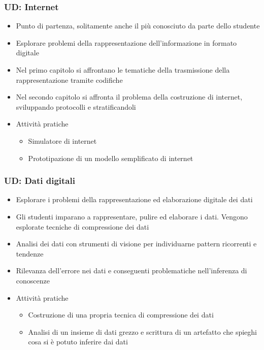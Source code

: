 \documentclass{beamer}
\begin{document}
\begin{frame}
  \frametitle{UD: Internet}

  \begin{itemize}
    \item Punto di partenza, solitamente anche il più conosciuto da parte dello studente
    \item Esplorare problemi della rappresentazione dell'informazione in formato digitale
    \item Nel primo capitolo si affrontano le tematiche della trasmissione della rappresentazione tramite codifiche
    \item Nel secondo capitolo si affronta il problema della costruzione di internet, sviluppando protocolli e stratificandoli
    \item Attività pratiche
    \begin{itemize}
      \item Simulatore di internet
      \item Prototipazione di un modello semplificato di internet
    \end{itemize}
  \end{itemize}
\end{frame}

\begin{frame}
  \frametitle{UD: Dati digitali}

  \begin{itemize}
    \item Esplorare i problemi della rappresentazione ed elaborazione digitale dei dati
    \item Gli studenti imparano a rappresentare, pulire ed elaborare i dati. Vengono esplorate tecniche di compressione dei dati
    \item Analisi dei dati con strumenti di visione per individuarne pattern ricorrenti e tendenze
    \item Rilevanza dell'errore nei dati e conseguenti problematiche nell'inferenza di conoscenze
    \item Attività pratiche
    \begin{itemize}
      \item Costruzione di una propria tecnica di compressione dei dati
      \item Analisi di un insieme di dati grezzo e scrittura di un artefatto che spieghi cosa si è potuto inferire dai dati
    \end{itemize}
  \end{itemize}
\end{frame}
\end{document}
